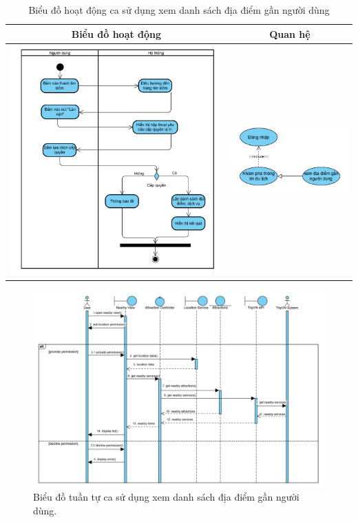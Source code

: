 \begin{table}[H] %
    \centering
    \caption{Biểu đồ hoạt động ca sử dụng xem danh sách địa điểm gần người dùng} %
    \label{tab:uc_nearby_places_diagrams} %
    \begin{tabular}{| c | c |}
        \hline
        \textbf{Biểu đồ hoạt động} & \textbf{Quan hệ} \\
        \hline
        \includegraphics[width=0.5\linewidth]{figures/c3/3-3-7-ad.png} %
        &
        \includegraphics[width=0.45\linewidth]{figures/c3/3-3-7-rd.png} \\ %
        \hline
    \end{tabular}
\end{table}

\begin{figure}[H]
    \centering
    \includegraphics[width=1\textwidth]{figures/c3/3-3-7-sd.png} %
    \caption{Biểu đồ tuần tự ca sử dụng xem danh sách địa điểm gần người dùng.}
    \label{fig:3-3-7-sequence-diagram}
\end{figure}